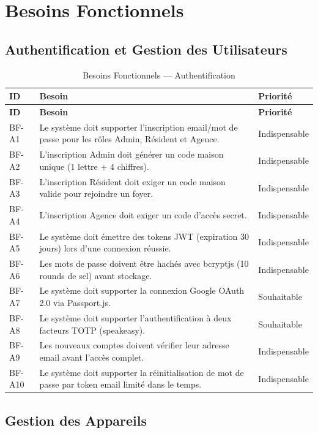 \section{Besoins Fonctionnels}

\subsection{Authentification et Gestion des Utilisateurs}

\begin{longtable}{p{} p{} p{}}
\caption{Besoins Fonctionnels --- Authentification}\label{tab:bf_auth}\\
\toprule
\textbf{ID} & \textbf{Besoin} & \textbf{Priorité} \\
\midrule
\endfirsthead
\toprule
\textbf{ID} & \textbf{Besoin} & \textbf{Priorité} \\
\midrule
\endhead
\bottomrule
\endfoot
BF-A1  & Le système doit supporter l'inscription email/mot de passe pour les rôles Admin, Résident et Agence. & Indispensable \\
BF-A2  & L'inscription Admin doit générer un code maison unique (1 lettre + 4 chiffres). & Indispensable \\
BF-A3  & L'inscription Résident doit exiger un code maison valide pour rejoindre un foyer. & Indispensable \\
BF-A4  & L'inscription Agence doit exiger un code d'accès secret. & Indispensable \\
BF-A5  & Le système doit émettre des tokens JWT (expiration 30 jours) lors d'une connexion réussie. & Indispensable \\
BF-A6  & Les mots de passe doivent être hachés avec bcryptjs (10 rounds de sel) avant stockage. & Indispensable \\
BF-A7  & Le système doit supporter la connexion Google OAuth 2.0 via Passport.js. & Souhaitable \\
BF-A8  & Le système doit supporter l'authentification à deux facteurs TOTP (speakeasy). & Souhaitable \\
BF-A9  & Les nouveaux comptes doivent vérifier leur adresse email avant l'accès complet. & Indispensable \\
BF-A10 & Le système doit supporter la réinitialisation de mot de passe par token email limité dans le temps. & Indispensable \\
\end{longtable}

\subsection{Gestion des Appareils}

